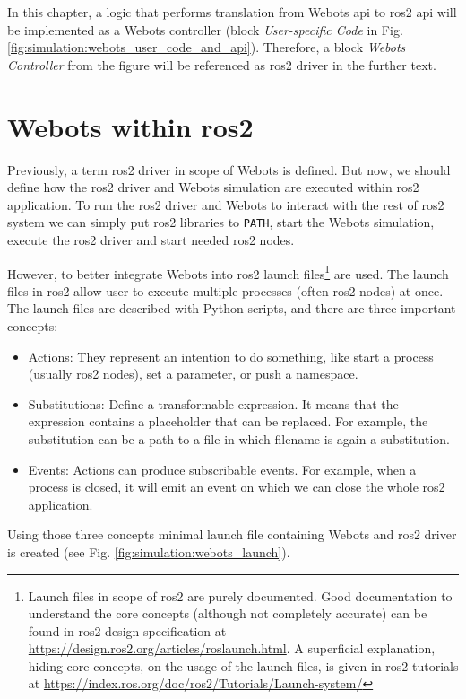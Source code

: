In this chapter, a logic that performs translation from Webots \ac{api} to \ac{ros2} \ac{api} will be implemented as a Webots controller (block \textit{User-specific Code} in Fig. \ref{fig:simulation:webots_user_code_and_api}).
Therefore, a block \textit{Webots Controller} from the figure will be referenced as \ac{ros2} driver in the further text.

\section{Webots within \ac{ros2}}
Previously, a term \ac{ros2} driver in scope of Webots is defined.
But now, we should define how the \ac{ros2} driver and Webots simulation are executed within \ac{ros2} application. To run the \ac{ros2} driver and Webots to interact with the rest of \ac{ros2} system we can simply put \ac{ros2} libraries to \texttt{PATH}, start the Webots simulation, execute the \ac{ros2} driver and start needed \ac{ros2} nodes.

However, to better integrate Webots into \ac{ros2} launch files\footnote{Launch files in scope of \ac{ros2} are purely documented. Good documentation to understand the core concepts (although not completely accurate) can be found in \ac{ros2} design specification at \url{https://design.ros2.org/articles/roslaunch.html}. A superficial explanation, hiding core concepts, on the usage of the launch files, is given in \ac{ros2} tutorials at \url{https://index.ros.org/doc/ros2/Tutorials/Launch-system/}} are used. The launch files in \ac{ros2} allow user to execute multiple processes (often \ac{ros2} nodes) at once. The launch files are described with Python scripts, and there are three important concepts:
\begin{itemize}
    \item Actions: They represent an intention to do something, like start a process (usually \ac{ros2} nodes), set a parameter, or push a namespace. 
    \item Substitutions: Define a transformable expression. 
    It means that the expression contains a placeholder that can be replaced.
    For example, the substitution can be a path to a file in which filename is again a substitution.
    \item Events: Actions can produce subscribable events.
    For example, when a process is closed, it will emit an event on which we can close the whole \ac{ros2} application.
\end{itemize}

Using those three concepts minimal launch file containing Webots and \ac{ros2} driver is created (see Fig. \ref{fig:simulation:webots_launch}).

